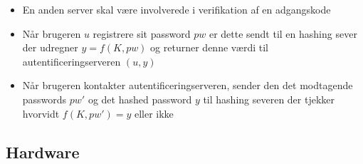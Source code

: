 \documentclass[a4, english]{article}
\begin{document}
\begin{itemize}
\begin{enumerate}
\begin{itemize}
      \item En anden server skal være involverede i verifikation af en adgangskode     
      \item Når brugeren $u$ registrere sit password $pw$ er dette sendt til en hashing sever der udregner $y=f(K,pw)$ og returner denne værdi til autentificeringserveren $(u,y)$ 
      \item Når brugeren kontakter autentificeringserveren, sender den det modtagende passwords $pw'$ og det hashed password $y$ til hashing severen der tjekker hvorvidt $f(K,pw')=y$ eller ikke  
    \end{itemize}
  \end{enumerate}
\end{itemize}

\subsection{Hardware}
\end{document}
